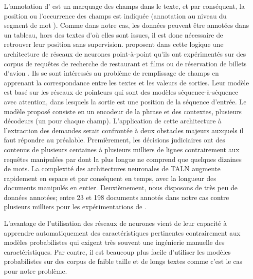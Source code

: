 L'annotation d'\citet{ace2005event} est un marquage des champs dans le texte, et par conséquent, la position ou l'occurrence des champs est indiquée (\og annotation au niveau du segment de mot \fg{}). Comme dans notre cas, les données peuvent être annotées dans un tableau, hors des textes d'où elles sont issues, il est donc nécessaire de retrouver leur position sans supervision. \citet{palm2017e2e-dnn} proposent dans cette logique une architecture de réseaux de neurones point-à-point qu'ils ont expérimentés sur des corpus de requêtes de recherche de restaurant et films \citep{liu2013mitmovierestaurant} ou de réservation de billets d'avion \citep{price1990atis}. Ils se sont intéressés au problème de remplissage de champs en apprenant la correspondance entre les textes et les valeurs de sorties. Leur modèle est basé sur les réseaux de pointeurs \citep{vinyals2015pointernetworks} qui sont des modèles séquence-à-séquence avec attention, dans lesquels la sortie est une position de la séquence d'entrée. Le modèle proposé consiste en un encodeur de la phrase et des contextes, plusieurs décodeurs (un pour chaque champ). L'application de cette architecture à l'extraction des demandes serait confrontée à deux obstacles majeurs auxquels il faut répondre au préalable. Premièrement, les décisions judiciaires ont des contenus de plusieurs centaines à plusieurs milliers de lignes contrairement aux requêtes manipulées par \citet{palm2017e2e-dnn}  dont la plus longue ne comprend que quelques dizaines de mots. La complexité des architectures neuronales de TALN augmente rapidement en espace et par conséquent en temps, avec la longueur des documents manipulés en entier. Deuxièmement, nous disposons de très peu de données annotées; entre 23 et 198 documents annotés dans notre cas contre plusieurs milliers pour les expérimentations de \citet{palm2017e2e-dnn}.

L'avantage de l'utilisation des réseaux de neurones vient de leur capacité à apprendre automatiquement des caractéristiques pertinentes contrairement aux modèles probabilistes qui exigent très souvent une ingénierie manuelle des caractéristiques. Par contre, il est beaucoup plus facile d'utiliser les modèles probabilistes sur des corpus de faible taille et de longs textes comme c'est le cas pour notre problème.


